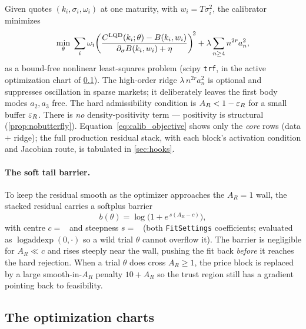 \documentclass[11pt]{article}
\begin{document}
Given quotes $(k_i,\sigma_i,\omega_i)$ at one maturity, with $w_i=T\sigma_i^2$,
the calibrator minimizes
\begin{equation}
\min_\theta\;\sum_i\omega_i\!\left(\frac{C^{\mathrm{LQD}}(k_i;\theta)-B(k_i,w_i)}{\partial_\sigma B(k_i,w_i)+\eta}\right)^{\!2}
+\lambda\sum_{n\ge4}n^{2r}a_n^2,
\label{eq:calib_objective}
\end{equation}
as a bound-free nonlinear least-squares problem (scipy \texttt{trf}, in the
active optimization chart of \cref{sec:charts}). The
high-order ridge $\lambda\,n^{2r}a_n^2$ is optional and suppresses oscillation in
sparse markets; it deliberately leaves the first body modes $a_2,a_3$ free. The
hard admissibility condition is $A_R<1-\varepsilon_R$ for a small buffer $\varepsilon_R$. There
is \emph{no} density-positivity term --- positivity is structural
(\cref{prop:nobutterfly}). Equation~\eqref{eq:calib_objective} shows only the
\emph{core} rows (data $+$ ridge); the full production residual stack, with each
block's activation condition and Jacobian route, is tabulated in
\cref{sec:hooks}.

\paragraph{The soft tail barrier.} To keep the residual smooth as the optimizer
approaches the $A_R=1$ wall, the stacked residual carries a softplus barrier
\begin{equation}
b(\theta)=\log\!\big(1+e^{\,s(A_R-c)}\big),
\label{eq:barrier}
\end{equation}
with centre $c=$ \lqdbarriercenter\ and steepness $s=$ \lqdbarrierscale\ (both
\texttt{FitSettings} coefficients; evaluated as
$\operatorname{logaddexp}(0,\cdot)$ so a wild trial $\theta$ cannot overflow
it). The barrier is negligible for $A_R\ll c$ and
rises steeply near the wall, pushing the fit back \emph{before} it reaches the
hard rejection. When a trial $\theta$ does cross $A_R\ge1$, the price block is
replaced by a large smooth-in-$A_R$ penalty $10+A_R$ so the trust region still
has a gradient pointing back to feasibility.

\subsection{The optimization charts}
\label{sec:charts}
\end{document}
